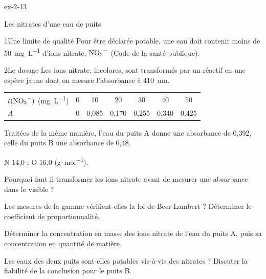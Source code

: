 \begin{blocLivre}{ex-2-13}
\begin{exercice}[3]{Les nitrates d'une eau de puits}
\begin{docu}{1}{Une limite de qualité}
Pour être déclarée potable, une eau doit contenir moins de \qty{50}{mg.L^{-1}} d'ions nitrate, $\ce{NO3-}$ (Code de la santé publique).
\end{docu}
\begin{docu}{2}{Le dosage}
Les ions nitrate, incolores, sont transformés par un réactif en une espèce jaune dont on mesure l'absorbance à \qty{410}{nm}.
\par\smallskip\noindent\hfill\begin{tabular}{lcccccc}
\toprule
$t(\ce{NO3-})$ (\unit{mg.L^{-1}}) & 0 & 10 & 20 & 30 & 40 & 50 \\
$A$ & 0 & 0,085 & 0,170 & 0,255 & 0,340 & 0,425 \\
\bottomrule
\end{tabular}\hfill\null\par\smallskip
Traitées de la même manière, l'eau du puits A donne une absorbance de 0,392, celle du puits B une absorbance de 0,48.
\end{docu}
\begin{donnees}
N 14,0 ; O 16,0 (\unit{g.mol^{-1}}).
\end{donnees}
\begin{questions}
\item Pourquoi faut-il transformer les ions nitrate avant de mesurer une absorbance dans le visible ?
\item Les mesures de la gamme vérifient-elles la loi de Beer-Lambert ? Déterminer le coefficient de proportionnalité.
\item Déterminer la concentration en masse des ions nitrate de l'eau du puits A, puis sa concentration en quantité de matière.
\item \initiative Les eaux des deux puits sont-elles potables vis-à-vis des nitrates ? Discuter la fiabilité de la conclusion
pour le puits B.
\end{questions}
\end{exercice}
\end{blocLivre}
